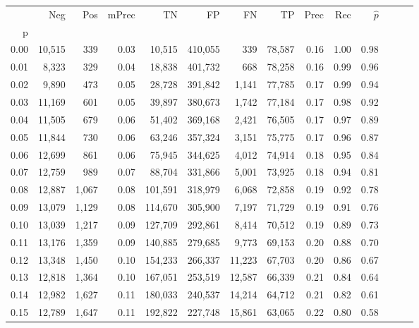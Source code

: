 \begin{tabular}{rrrrrrrrrrrrrr}
\toprule
{} &     Neg &    Pos & mPrec &       TN &       FP &      FN &      TP &  Prec &   Rec & $\hat{p}$ \\
p    &         &        &       &          &          &         &         &       &       &           \\
\midrule
0.00 &  10,515 &    339 &  0.03 &   10,515 &  410,055 &     339 &  78,587 &  0.16 &  1.00 &      0.98 \\
0.01 &   8,323 &    329 &  0.04 &   18,838 &  401,732 &     668 &  78,258 &  0.16 &  0.99 &      0.96 \\
0.02 &   9,890 &    473 &  0.05 &   28,728 &  391,842 &   1,141 &  77,785 &  0.17 &  0.99 &      0.94 \\
0.03 &  11,169 &    601 &  0.05 &   39,897 &  380,673 &   1,742 &  77,184 &  0.17 &  0.98 &      0.92 \\
0.04 &  11,505 &    679 &  0.06 &   51,402 &  369,168 &   2,421 &  76,505 &  0.17 &  0.97 &      0.89 \\
0.05 &  11,844 &    730 &  0.06 &   63,246 &  357,324 &   3,151 &  75,775 &  0.17 &  0.96 &      0.87 \\
0.06 &  12,699 &    861 &  0.06 &   75,945 &  344,625 &   4,012 &  74,914 &  0.18 &  0.95 &      0.84 \\
0.07 &  12,759 &    989 &  0.07 &   88,704 &  331,866 &   5,001 &  73,925 &  0.18 &  0.94 &      0.81 \\
0.08 &  12,887 &  1,067 &  0.08 &  101,591 &  318,979 &   6,068 &  72,858 &  0.19 &  0.92 &      0.78 \\
0.09 &  13,079 &  1,129 &  0.08 &  114,670 &  305,900 &   7,197 &  71,729 &  0.19 &  0.91 &      0.76 \\
0.10 &  13,039 &  1,217 &  0.09 &  127,709 &  292,861 &   8,414 &  70,512 &  0.19 &  0.89 &      0.73 \\
0.11 &  13,176 &  1,359 &  0.09 &  140,885 &  279,685 &   9,773 &  69,153 &  0.20 &  0.88 &      0.70 \\
0.12 &  13,348 &  1,450 &  0.10 &  154,233 &  266,337 &  11,223 &  67,703 &  0.20 &  0.86 &      0.67 \\
0.13 &  12,818 &  1,364 &  0.10 &  167,051 &  253,519 &  12,587 &  66,339 &  0.21 &  0.84 &      0.64 \\
0.14 &  12,982 &  1,627 &  0.11 &  180,033 &  240,537 &  14,214 &  64,712 &  0.21 &  0.82 &      0.61 \\
0.15 &  12,789 &  1,647 &  0.11 &  192,822 &  227,748 &  15,861 &  63,065 &  0.22 &  0.80 &      0.58 \\

\end{tabular}
